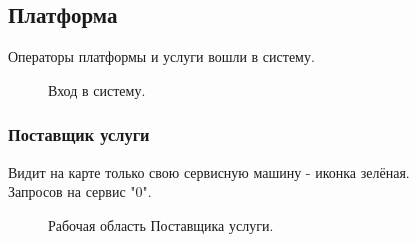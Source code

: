 \documentclass[russian,utf8,12pt,emptystyle]{eskdtext}
\begin{document}
\subsection{Платформа}
Операторы платформы и услуги вошли в систему.
\begin{figure}[h]
\begin{minipage}[h]{0.9\linewidth}
\end{minipage}
\hfill
\begin{minipage}[h]{0.9\linewidth}
\end{minipage}
\caption{Вход в систему.}
\label{ris:image1}
\end{figure}

\newpage
 \subsubsection{Поставщик услуги}
 Видит на карте только свою сервисную машину - иконка зелёная.
 \\
  Запросов на сервис "0".
  \begin{figure}[h]
  \begin{center}
  \end{center}
  \caption{Рабочая область Поставщика услуги.}
  \label{ris:image3}
  \end{figure}
 \newpage
\end{document}
